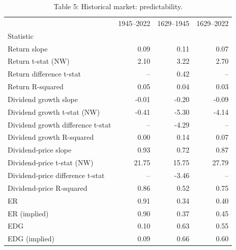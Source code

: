 \begin{table}
\caption{Table 5: Historical market: predictability.}
\label{tab:replication_5}
\begin{tabular}{lrrr}
\toprule
 & 1945–2022 & 1629–1945 & 1629–2022 \\
Statistic &  &  &  \\
\midrule
Return slope & 0.09 & 0.11 & 0.07 \\
Return t-stat (NW) & 2.10 & 3.22 & 2.70 \\
Return difference t-stat & -- & 0.42 & -- \\
Return R-squared & 0.05 & 0.04 & 0.03 \\
Dividend growth slope & -0.01 & -0.20 & -0.09 \\
Dividend growth t-stat (NW) & -0.41 & -5.30 & -4.14 \\
Dividend growth difference t-stat & -- & -4.29 & -- \\
Dividend growth R-squared & 0.00 & 0.14 & 0.07 \\
Dividend-price slope & 0.93 & 0.72 & 0.87 \\
Dividend-price t-stat (NW) & 21.75 & 15.75 & 27.79 \\
Dividend-price difference t-stat & -- & -3.46 & -- \\
Dividend-price R-squared & 0.86 & 0.52 & 0.75 \\
ER & 0.91 & 0.34 & 0.40 \\
ER (implied) & 0.90 & 0.37 & 0.45 \\
EDG & 0.10 & 0.63 & 0.55 \\
EDG (implied) & 0.09 & 0.66 & 0.60 \\
\bottomrule
\end{tabular}
\end{table}
